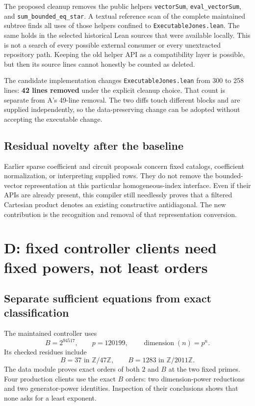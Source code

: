 \documentclass[11pt,letterpaper]{article}
\newcommand{\code}[1]{{\small\nolinkurl{#1}}}
\begin{document}
The proposed cleanup removes the public helpers \code{vectorSum}, \code{eval_vectorSum}, and \code{sum_bounded_eq_star}. A textual reference scan of the complete maintained subtree finds all uses of those helpers confined to \code{ExecutableJones.lean}. The same holds in the selected historical Lean sources that were available locally. This is not a search of every possible external consumer or every unextracted repository path. Keeping the old helper API as a compatibility layer is possible, but then its source lines cannot honestly be counted as deleted.

The candidate implementation changes \code{ExecutableJones.lean} from 300 to 258 lines: \textbf{42 lines removed} under the explicit cleanup choice. That count is separate from A's 49-line removal. The two diffs touch different blocks and are supplied independently, so the data-preserving change can be adopted without accepting the executable change.

\subsection{Residual novelty after the baseline}

Earlier sparse coefficient and circuit proposals concern fixed catalogs, coefficient normalization, or interpreting supplied rows. They do not remove the bounded-vector representation at this particular homogeneous-index interface. Even if their APIs are already present, this compiler still needlessly proves that a filtered Cartesian product denotes an existing constructive antidiagonal. The new contribution is the recognition and removal of that representation conversion.

\section{D: fixed controller clients need fixed powers, not least orders}
\label{sec:controller}

\subsection{Separate sufficient equations from exact classification}

The maintained controller uses
\[
 B=2^{94517},\qquad p=120199,\qquad \operatorname{dimension}(n)=p^n.
\]
Its checked residues include
\[
 B=37\text{ in }\mathbb Z/47\mathbb Z,
 \qquad
 B=1283\text{ in }\mathbb Z/2011\mathbb Z.
\]
The data module proves exact orders of both $2$ and $B$ at the two fixed primes. Four production clients use the exact $B$ orders: two dimension-power reductions and two generator-power identities. Inspection of their conclusions shows that none asks for a least exponent.\cite{controllerdata,controllerunits,powercoordinates}
\end{document}
